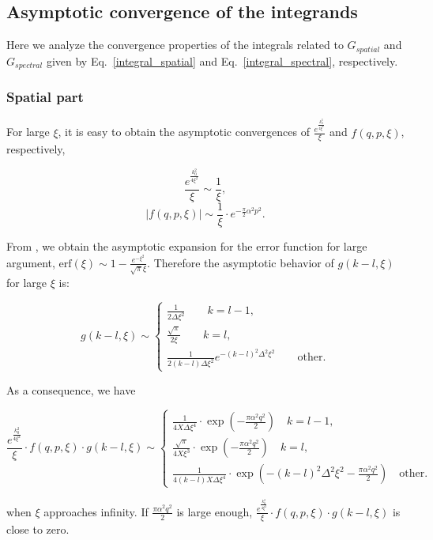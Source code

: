 \documentclass[preprint,12pt]{elsarticle}
\begin{document}
\subsection{Asymptotic {c}onvergence of the integrands}
Here we analyze the convergence properties of the integrals related to $G_{spatial}$ and $G_{spectral}$ given by Eq.~\eqref{integral_spatial} and Eq.~\eqref{integral_spectral}, respectively.

\subsubsection{Spatial part}
 For large $\xi$, it is easy to obtain the asymptotic convergences of $\frac{e^{\frac{k^2_0}{4\xi^2}}}{\xi}$ {and} $f(q,p,\xi)${,} respectively,
\begin{small}
 \begin{equation}
\frac{e^{\frac{k^2_0}{4\xi^2}}}{\xi} \sim \frac{1}{\xi},
 \end{equation}
\begin{equation}
 \big| f(q,p,\xi) \big| \sim  \frac{1}{\xi} \cdot e^{ - \frac{\pi}{2}\alpha^2 p^2}.
 \end{equation}
\end{small}
From \cite{Capolino2005Efficient}, we obtain the asymptotic expansion for the error function for large argument, $\text{erf}(\xi) \sim 1 - \frac{e^{-\xi^2}}{\sqrt{\pi}\xi}$. Therefore the asymptotic behavior of $g(k-l,\xi)$ for large $\xi$ {is}:
 \begin{small}
 \begin{equation}
 g(k-l,\xi) \sim \left\{ \begin{array}{ll}
 \frac{1}{2\Delta \xi^2} \qquad k = l-1, \\
 \frac{\sqrt{\pi}}{2\xi} \qquad   k = l, \\
 \frac{1}{2(k-l) \Delta \xi^2}e^{-(k-l)^2\Delta^2 \xi^2} \qquad \text{other}.
 \end{array}\right.
 \end{equation}
 \end{small} 
 As a consequence, we have
 \begin{small}
 \begin{equation}
 \frac{e^{\frac{k_0^2}{4\xi^2}}}{\xi} \cdot f(q,p,\xi) \cdot g(k-l,\xi) \sim 
 \left\{\begin{array}{ll}
  \frac{1}{4X\Delta \xi^4} \cdot \exp \left( -\frac{\pi \alpha^2 q^2}{2} \right) \quad  k=l -1 ,\\
 \frac{\sqrt{\pi}}{4X\xi^3} \cdot \exp \left( -\frac{\pi \alpha^2 q^2}{2} \right) \quad  k= l ,\\
 \frac{1}{4(k-l)X\Delta \xi^4} \cdot \exp \left( - (k-l)^2\Delta^2 \xi^2 - \frac{\pi \alpha^2 q^2}{2} \right) \quad \text{other}.
 \end{array}\right.
 \label{limit_spatial}
 \end{equation}
 \end{small}
 when $\xi$ approaches infinity.
 If $\frac{\pi\alpha^2q^2}{2}$ is large enough, $\frac{e^{\frac{k_0^2}{4\xi^2}}}{\xi} \cdot f(q,p,\xi) \cdot g(k-l,\xi)$ is close to zero.
 
\end{document}
